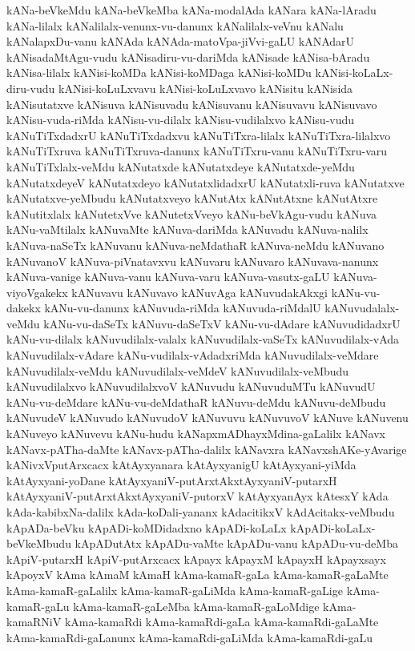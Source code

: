 {kANa-beVkeMdu
kANa-beVkeMba
kANa-modalAda
kANara
kANa-lAradu
kANa-lilalx
kANalilalx-venunx-vu-danunx
kANalilalx-veVnu
kANalu
kANalapxDu-vanu
kANAda
kANAda-matoVpa-jiVvi-gaLU
kANAdarU
kANisadaMtAgu-vudu
kANisadiru-vu-dariMda
kANisade
kANisa-bAradu
kANisa-lilalx
kANisi-koMDa
kANisi-koMDaga
kANisi-koMDu
kANisi-koLaLx-diru-vudu
kANisi-koLuLxvavu
kANisi-koLuLxvavo
kANisitu
kANisida
kANisutatxve
kANisuva
kANisuvadu
kANisuvanu
kANisuvavu
kANisuvavo
kANisu-vuda-riMda
kANisu-vu-dilalx
kANisu-vudilalxvo
kANisu-vudu
kANuTiTxdadxrU
kANuTiTxdadxvu
kANuTiTxra-lilalx
kANuTiTxra-lilalxvo
kANuTiTxruva
kANuTiTxruva-danunx
kANuTiTxru-vanu
kANuTiTxru-varu
kANuTiTxlalx-veMdu
kANutatxde
kANutatxdeye
kANutatxde-yeMdu
kANutatxdeyeV
kANutatxdeyo
kANutatxlidadxrU
kANutatxli-ruva
kANutatxve
kANutatxve-yeMbudu
kANutatxveyo
kANutAtx
kANutAtxne
kANutAtxre
kANutitxlalx
kANutetxVve
kANutetxVveyo
kANu-beVkAgu-vudu
kANuva
kANu-vaMtilalx
kANuvaMte
kANuva-dariMda
kANuvadu
kANuva-nalilx
kANuva-naSeTx
kANuvanu
kANuva-neMdathaR
kANuva-neMdu
kANuvano
kANuvanoV
kANuva-piVnatavxvu
kANuvaru
kANuvaro
kANuvava-nanunx
kANuva-vanige
kANuva-vanu
kANuva-varu
kANuva-vasutx-gaLU
kANuva-viyoVgakekx
kANuvavu
kANuvavo
kANuvAga
kANuvudakAkxgi
kANu-vu-dakekx
kANu-vu-danunx
kANuvuda-riMda
kANuvuda-riMdalU
kANuvudalalx-veMdu
kANu-vu-daSeTx
kANuvu-daSeTxV
kANu-vu-dAdare
kANuvudidadxrU
kANu-vu-dilalx
kANuvudilalx-valalx
kANuvudilalx-vaSeTx
kANuvudilalx-vAda
kANuvudilalx-vAdare
kANu-vudilalx-vAdadxriMda
kANuvudilalx-veMdare
kANuvudilalx-veMdu
kANuvudilalx-veMdeV
kANuvudilalx-veMbudu
kANuvudilalxvo
kANuvudilalxvoV
kANuvudu
kANuvuduMTu
kANuvudU
kANu-vu-deMdare
kANu-vu-deMdathaR
kANuvu-deMdu
kANuvu-deMbudu
kANuvudeV
kANuvudo
kANuvudoV
kANuvuvu
kANuvuvoV
kANuve
kANuvenu
kANuveyo
kANuvevu
kANu-hudu
kANapxmADhayxMdina-gaLalilx
kANavx
kANavx-pATha-daMte
kANavx-pATha-dalilx
kANavxra
kANavxshAKe-yAvarige
kANivxVputArxcacx
kAtAyxyanara
kAtAyxyanigU
kAtAyxyani-yiMda
kAtAyxyani-yoDane
kAtAyxyaniV-putArxtAkxtAyxyaniV-putarxH
kAtAyxyaniV-putArxtAkxtAyxyaniV-putorxV
kAtAyxyanAyx
kAtesxY
kAda
kAda-kabibxNa-dalilx
kAda-koDali-yananx
kAdacitikxV
kAdAcitakx-veMbudu
kApADa-beVku
kApADi-koMDidadxno
kApADi-koLaLx
kApADi-koLaLx-beVkeMbudu
kApADutAtx
kApADu-vaMte
kApADu-vanu
kApADu-vu-deMba
kApiV-putarxH
kApiV-putArxcacx
kApayx
kApayxM
kApayxH
kApayxsayx
kApoyxV
kAma
kAmaM
kAmaH
kAma-kamaR-gaLa
kAma-kamaR-gaLaMte
kAma-kamaR-gaLalilx
kAma-kamaR-gaLiMda
kAma-kamaR-gaLige
kAma-kamaR-gaLu
kAma-kamaR-gaLeMba
kAma-kamaR-gaLoMdige
kAma-kamaRNiV
kAma-kamaRdi
kAma-kamaRdi-gaLa
kAma-kamaRdi-gaLaMte
kAma-kamaRdi-gaLanunx
kAma-kamaRdi-gaLiMda
kAma-kamaRdi-gaLu
}
